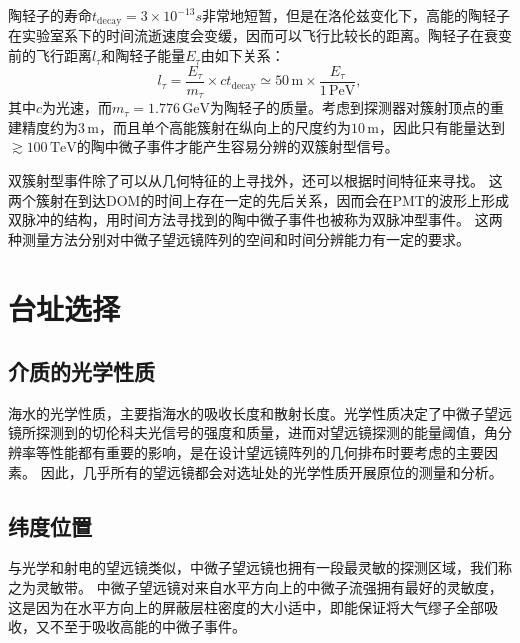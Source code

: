 陶轻子的寿命$t_\mathrm{decay} = 3\times10^{-13}s$非常地短暂，但是在洛伦兹变化下，高能的陶轻子在实验室系下的时间流逝速度会变缓，因而可以飞行比较长的距离。陶轻子在衰变前的飞行距离$l_\tau$和陶轻子能量$E_\tau$由如下关系：
\begin{equation}
    l_\tau = \frac{E_\tau}{m_\tau} \times c t_\mathrm{decay} \simeq 50\,\mathrm{m} \times \frac{E_\tau}{1\,\mathrm{PeV}} ,
    \label{eq:tau_decay}
\end{equation}
其中$c$为光速，而$m_\tau=1.776 \,\mathrm{GeV}$为陶轻子的质量。考虑到探测器对簇射顶点的重建精度约为$3\,\mathrm{m}$，而且单个高能簇射在纵向上的尺度约为$10\,\mathrm{m}$，因此只有能量达到$\gtrsim 100 \, \mathrm{TeV}$的陶中微子事件才能产生容易分辨的双簇射型信号。

双簇射型事件除了可以从几何特征的上寻找外\cite{IceCube_tau:2020}，还可以根据时间特征来寻找。
这两个簇射在到达DOM的时间上存在一定的先后关系，因而会在PMT的波形上形成双脉冲的结构，用时间方法寻找到的陶中微子事件也被称为双脉冲型事件\cite{IceCube_tau_Donglian:2015, IceCube_tau_Logan:2019, Tian_tau_double_pulse:2021}。
这两种测量方法分别对中微子望远镜阵列的空间和时间分辨能力有一定的要求。

\section{台址选择}

\subsection{介质的光学性质}

海水的光学性质，主要指海水的吸收长度和散射长度。光学性质决定了中微子望远镜所探测到的切伦科夫光信号的强度和质量，进而对望远镜探测的能量阈值，角分辨率等性能都有重要的影响，是在设计望远镜阵列的几何排布时要考虑的主要因素。
因此，几乎所有的望远镜都会对选址处的光学性质开展原位的测量和分析\cite{OP_ANTARES:2004, OP_Baikal:2012, OP_Grace:2018, OP_IceCube:2006, OP_IceCube:2013, OP_NEMO:2006, OP_P-One:2021}。

\subsection{纬度位置}

与光学和射电的望远镜类似，中微子望远镜也拥有一段最灵敏的探测区域，我们称之为灵敏带。
中微子望远镜对来自水平方向上的中微子流强拥有最好的灵敏度，这是因为在水平方向上的屏蔽层柱密度的大小适中，即能保证将大气缪子全部吸收，又不至于吸收高能的中微子事件。

